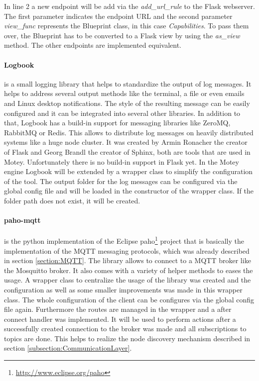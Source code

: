 In line 2 a new endpoint will be add via the \textit{add\_url\_rule} to the Flask webserver.
The first parameter indicates the endpoint \ac{URL} and the second parameter \textit{view\_func} represents the Blueprint class, in this case \textit{Capabilities}.
To pass them over, the Blueprint has to be converted to a Flask view by using the \textit{as\_view} method.
The other endpoints are implemented equivalent.

\paragraph{Logbook} is a small logging library that helps to standardize the output of log messages.
It helps to address several output methods like the terminal, a file or even emails and Linux desktop notifications.
The style of the resulting message can be easily configured and it can be integrated into several other libraries.
In addition to that, Logbook has a build-in support for messaging libraries like ZeroMQ, RabbitMQ or Redis.
This allows to distribute log messages on heavily distributed systems like a huge node cluster.
It was created by Armin Ronacher the creator of Flask and Georg Brandl the creator of Sphinx, both are tools that are used in Motey.
Unfortunately there is no build-in support in Flask yet.
In the Motey engine Logbook will be extended by a wrapper class to simplify the configuration of the tool.
The output folder for the log messages can be configured via the global config file and will be loaded in the constructor of the wrapper class.
If the folder path does not exist, it will be created.

\paragraph{paho-mqtt} is the python implementation of the Eclipse paho\footnote{\url{http://www.eclipse.org/paho}} project that is basically the implementation of the \ac{MQTT} messaging protocols, which was already described in section \ref{section:MQTT}.
The library allows to connect to a \ac{MQTT} broker like the Mosquitto broker.
It also comes with a variety of helper methods to eases the usage.
A wrapper class to centralize the usage of the library was created and the configuration as well as some smaller improvements was made in this wrapper class.
The whole configuration of the client can be configures via the global config file again.
Furthermore the routes are managed in the wrapper and a after connect handler was implemented.
It will be used to perform actions after a successfully created connection to the broker was made and all subscriptions to topics are done.
This helps to realize the node discovery mechanism described in section \ref{subsection:CommunicationLayer}.

